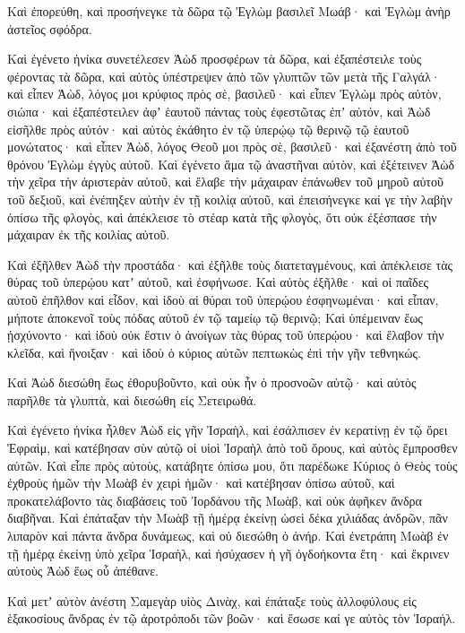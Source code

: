 {Καὶ ἐπορεύθη, καὶ προσήνεγκε τὰ δῶρα τῷ Ἐγλὼμ βασιλεῖ Μωάβ· καὶ Ἐγλὼμ ἀνὴρ ἀστεῖος σφόδρα.
\par }{\PP {}Καὶ ἐγένετο ἡνίκα συνετέλεσεν Ἀὼδ προσφέρων τὰ δῶρα, καὶ ἐξαπέστειλε τοὺς φέροντας τὰ δῶρα,
καὶ αὐτὸς ὑπέστρεψεν ἀπὸ τῶν γλυπτῶν τῶν μετὰ τῆς Γαλγάλ· καὶ εἶπεν Ἀὼδ, λόγος μοι κρύφιος πρὸς σὲ, βασιλεῦ· καὶ εἶπεν Ἐγλὼμ πρὸς αὐτὸν, σιώπα· καὶ ἐξαπέστειλεν ἀφʼ ἑαυτοῦ πάντας τοὺς ἐφεστῶτας ἐπʼ αὐτόν,
καὶ Ἀὼδ εἰσῆλθε πρὸς αὐτόν· καὶ αὐτὸς ἐκάθητο ἐν τῷ ὑπερῴῳ τῷ θερινῷ τῷ ἑαυτοῦ μονώτατος· καὶ εἶπεν Ἀὼδ, λόγος Θεοῦ μοι πρὸς σὲ, βασιλεῦ· καὶ ἐξανέστη ἀπὸ τοῦ θρόνου Ἐγλὼμ ἐγγὺς αὐτοῦ.
Καὶ ἐγένετο ἅμα τῷ ἀναστῆναι αὐτὸν, καὶ ἐξέτεινεν Ἀὼδ τὴν χεῖρα τὴν ἀριστερὰν αὐτοῦ, καὶ ἔλαβε τὴν μάχαιραν ἐπάνωθεν τοῦ μηροῦ αὐτοῦ τοῦ δεξιοῦ, καὶ ἐνέπηξεν αὐτὴν ἐν τῇ κοιλίᾳ αὐτοῦ,
καὶ ἐπεισήνεγκε καί γε τὴν λαβὴν ὀπίσω τῆς φλογὸς, καὶ ἀπέκλεισε τὸ στέαρ κατὰ τῆς φλογὸς, ὅτι οὐκ ἐξέσπασε τὴν μάχαιραν ἐκ τῆς κοιλίας αὐτοῦ.
\par }{\PP {}Καὶ ἐξῆλθεν Ἀὼδ τὴν προστάδα· καὶ ἐξῆλθε τοὺς διατεταγμένους, καὶ ἀπέκλεισε τὰς θύρας τοῦ ὑπερῴου κατʼ αὐτοῦ, καὶ ἐσφήνωσε.
Καὶ αὐτὸς ἐξῆλθε· καὶ οἱ παῖδες αὐτοῦ ἐπῆλθον καὶ εἶδον, καὶ ἰδοὺ αἱ θύραι τοῦ ὑπερῴου ἐσφηνωμέναι· καὶ εἶπαν, μήποτε ἀποκενοῖ τοὺς πόδας αὐτοῦ ἐν τῷ ταμείῳ τῷ θερινῷ;
Καὶ ὑπέμειναν ἕως ᾑσχύνοντο· καὶ ἰδοὺ οὐκ ἔστιν ὁ ἀνοίγων τὰς θύρας τοῦ ὑπερῴου· καὶ ἔλαβον τὴν κλεῖδα, καὶ ἤνοιξαν· καὶ ἰδοὺ ὁ κύριος αὐτῶν πεπτωκὼς ἐπὶ τὴν γῆν τεθνηκώς.
\par }{\PP {}Καὶ Ἀὼδ διεσώθη ἕως ἐθορυβοῦντο, καὶ οὐκ ἦν ὁ προσνοῶν αὐτῷ· καὶ αὐτὸς παρῆλθε τὰ γλυπτὰ, καὶ διεσώθη εἰς Σετειρωθά.
\par }{\PP {}Καὶ ἐγένετο ἡνίκα ἦλθεν Ἀὼδ εἰς γῆν Ἰσραὴλ, καὶ ἐσάλπισεν ἐν κερατίνῃ ἐν τῷ ὄρει Ἐφραὶμ, καὶ κατέβησαν σὺν αὐτῷ οἱ υἱοὶ Ἰσραὴλ ἀπὸ τοῦ ὄρους, καὶ αὐτὸς ἔμπροσθεν αὐτῶν.
Καὶ εἶπε πρὸς αὐτοὺς, κατάβητε ὀπίσω μου, ὅτι παρέδωκε Κύριος ὁ Θεὸς τοὺς ἐχθροὺς ἡμῶν τὴν Μωὰβ ἐν χειρὶ ἡμῶν· καὶ κατέβησαν ὀπίσω αὐτοῦ, καὶ προκατελάβοντο τὰς διαβάσεις τοῦ Ἰορδάνου τῆς Μωὰβ, καὶ οὐκ ἀφῆκεν ἄνδρα διαβῆναι.
Καὶ ἐπάταξαν τὴν Μωὰβ τῇ ἡμέρᾳ ἐκείνῃ ὡσεὶ δέκα χιλιάδας ἀνδρῶν, πᾶν λιπαρὸν καὶ πάντα ἄνδρα δυνάμεως, καὶ οὐ διεσώθη ὁ ἀνήρ.
Καὶ ἐνετράπη Μωὰβ ἐν τῇ ἡμέρᾳ ἐκείνῃ ὑπὸ χεῖρα Ἰσραὴλ, καὶ ἡσύχασεν ἡ γῆ ὀγδοήκοντα ἔτη· καὶ ἔκρινεν αὐτοὺς Ἀὼδ ἕως οὗ ἀπέθανε.
\par }{\PP {}Καὶ μετʼ αὐτὸν ἀνέστη Σαμεγὰρ υἱὸς Δινὰχ, καὶ ἐπάταξε τοὺς ἀλλοφύλους εἰς ἑξακοσίους ἄνδρας ἐν τῷ ἀροτρόποδι τῶν βοῶν· καὶ ἔσωσε καί γε αὐτὸς τὸν Ἰσραήλ.

}
